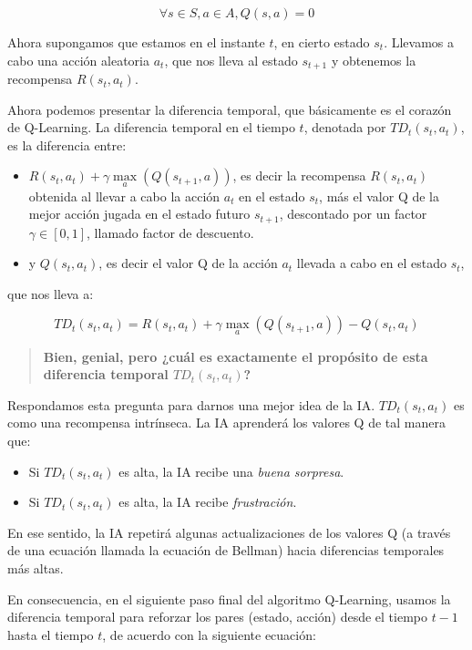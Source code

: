 \documentclass[
]{book}
\providecommand{\tightlist}{%
  \setlength{\itemsep}{0pt}\setlength{\parskip}{0pt}}
\begin{document}
\[\forall s \in S, a \in A, Q(s,a) = 0\]

Ahora supongamos que estamos en el instante \(t\), en cierto estado \(s_t\). Llevamos a cabo una acción aleatoria \(a_t\), que nos lleva al estado \(s_{t + 1}\) y obtenemos la recompensa \(R(s_t, a_t)\).

Ahora podemos presentar la diferencia temporal, que básicamente es el corazón de Q-Learning. La diferencia temporal en el tiempo \(t\), denotada por \(TD_t(s_t, a_t)\), es la diferencia entre:

\begin{itemize}
\item
  \(R(s_t,a_t) + \gamma \underset{a}{\max}(Q(s_{t+1},a))\), es decir la recompensa \(R (s_t, a_t)\) obtenida al llevar a cabo la acción \(a_t\) en el estado \(s_t\), más el valor Q de la mejor acción jugada en el estado futuro \(s_{t+1}\), descontado por un factor \(\gamma \in [0,1]\), llamado factor de descuento.
\item
  y \(Q(s_t, a_t)\), es decir el valor Q de la acción \(a_t\) llevada a cabo en el estado \(s_t\),
\end{itemize}

que nos lleva a:

\[TD_t(s_t,a_t) = R(s_t,a_t) + \gamma \underset{a}{\max}(Q(s_{t+1},a)) - Q(s_t,a_t)\]

\begin{quote}
\textbf{Bien, genial, pero ¿cuál es exactamente el propósito de esta diferencia temporal \(TD_t(s_t,a_t)\)?}
\end{quote}

Respondamos esta pregunta para darnos una mejor idea de la IA. \(TD_t (s_t, a_t)\) es como una recompensa intrínseca. La IA aprenderá los valores Q de tal manera que:

\begin{itemize}
\tightlist
\item
  Si \(TD_t(s_t,a_t)\) es alta, la IA recibe una \emph{buena sorpresa}.
\item
  Si \(TD_t(s_t,a_t)\) es alta, la IA recibe \emph{frustración}.
\end{itemize}

En ese sentido, la IA repetirá algunas actualizaciones de los valores Q (a través de una ecuación llamada la ecuación de Bellman) hacia diferencias temporales más altas.

En consecuencia, en el siguiente paso final del algoritmo Q-Learning, usamos la diferencia temporal para reforzar los pares (estado, acción) desde el tiempo \(t-1\) hasta el tiempo \(t\), de acuerdo con la siguiente ecuación:
\end{document}

